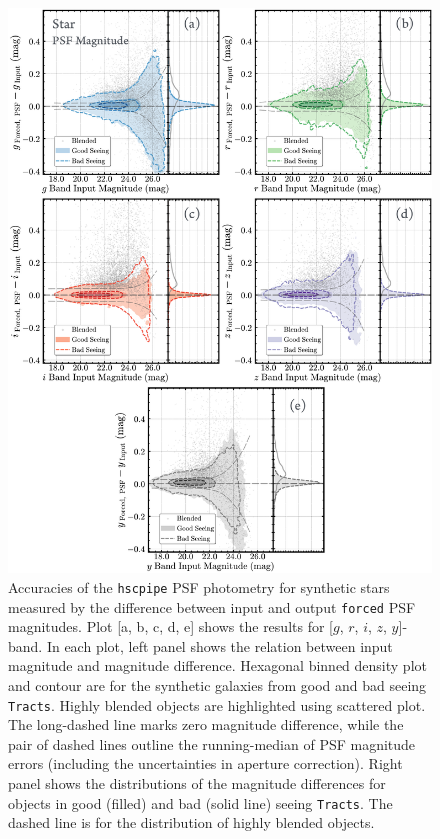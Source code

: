 \documentclass[useamsfonts]{pasj01}
\def\forced{\texttt{forced}}
\def\tracts{\texttt{Tracts}}
\begin{document}
\begin{figure}
    \begin{center}
        \includegraphics[width=16cm]{fig/synpipe_psf_mag}
    \end{center}
    \caption{
        Accuracies of the \texttt{hscpipe} PSF photometry for synthetic stars measured
        by the difference between input and output \forced{} PSF magnitudes. 
        Plot [a, b, c, d, e] shows the results for [$g$, $r$, $i$, $z$, $y$]-band. 
        In each plot, left panel shows the relation between input magnitude and 
        magnitude difference. 
        Hexagonal binned density plot and contour are for the synthetic galaxies from 
        good and bad seeing \tracts{}. 
        Highly blended objects are highlighted using scattered plot. 
        The long-dashed line marks zero magnitude difference, while the pair of 
        dashed lines outline the running-median of PSF magnitude errors 
        (including the uncertainties in aperture correction). 
        Right panel shows the distributions of the magnitude differences for objects 
        in good (filled) and bad (solid line) seeing \tracts{}. 
        The dashed line is for the distribution of highly blended objects. 
        }
    \label{fig:psf_mag}
\end{figure}
\end{document}
